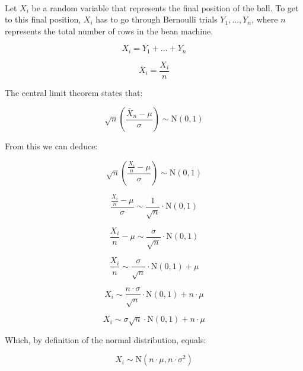 \documentclass[12pt]{article}
\begin{document}
\noindent
\\
Let $X_i$ be a random variable that represents the final position of the ball.
To get to this final position, $X_i$ has to go through Bernoulli trials $Y_1, ... , Y_n$, where $n$ represents the total number of rows in the bean machine. 

\[ X_i = Y_1 + ... + Y_n \]

\[ \bar{X}_i = \frac{X_i}{n} \]

\noindent
The central limit theorem states that:

\[ \sqrt{n} \left( \frac{\bar{X}_n - \mu}{\sigma} \right) \sim \text{N}(0, 1) \]

\noindent
From this we can deduce:

\[ \sqrt{n} \left( \frac{\frac{X_i}{n} - \mu}{\sigma} \right) \sim \text{N}(0, 1) \]

\[ \frac{\frac{X_i}{n} - \mu}{\sigma} \sim \frac{1}{\sqrt{n}} \cdot \text{N}(0, 1) \]

\[ \frac{X_i}{n} - \mu \sim \frac{\sigma}{\sqrt{n}} \cdot \text{N}(0, 1) \]

\[ \frac{X_i}{n} \sim \frac{\sigma}{\sqrt{n}} \cdot \text{N}(0, 1) + \mu \]

\[ X_i \sim \frac{n \cdot \sigma}{\sqrt{n}} \cdot \text{N}(0, 1) + n \cdot \mu \]

\[ X_i \sim \sigma \sqrt{n} \cdot \text{N}(0, 1) + n \cdot \mu \]

\noindent
Which, by definition of the normal distribution, equals:

\[ X_i \sim \text{N}(n \cdot \mu, n \cdot \sigma^2) \]
\end{document}
